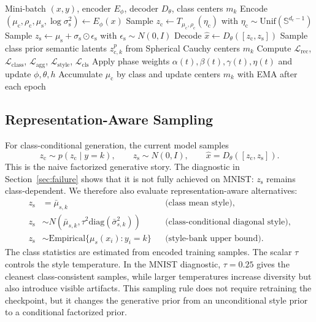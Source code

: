 \documentclass[10pt]{article}
\newcommand{\ours}{F-CS-WAE}
\newcommand{\zc}{z_{\mathrm{c}}}
\newcommand{\zs}{z_{\mathrm{s}}}
\newcommand{\Sph}{\mathbb{S}}
\begin{document}
\begin{algorithm}[t]
\caption{\ours{} training loop}
\label{alg:fcswae}
\begin{algorithmic}[1]
\Require Mini-batch $(x,y)$, encoder $E_\phi$, decoder $D_\theta$, class centers $m_k$
\State Encode $(\mu_{\mathrm{c}},\rho_{\mathrm{c}},\mu_{\mathrm{s}},\log\sigma_{\mathrm{s}}^2)\leftarrow E_\phi(x)$
\State Sample $\zc\leftarrow T_{\mu_{\mathrm{c}},\rho_{\mathrm{c}}}(\eta_{\mathrm{c}})$ with $\eta_{\mathrm{c}}\sim\mathrm{Unif}(\Sph^{d_{\mathrm{c}}-1})$
\State Sample $\zs\leftarrow \mu_{\mathrm{s}}+\sigma_{\mathrm{s}}\odot \epsilon_{\mathrm{s}}$ with $\epsilon_{\mathrm{s}}\sim N(0,I)$
\State Decode $\hat{x}\leftarrow D_\theta([\zc,\zs])$
\State Sample class prior semantic latents $z_{\mathrm{c},k}^p$ from Spherical Cauchy centers $m_k$
\State Compute $\mathcal{L}_{\mathrm{rec}}$, $\mathcal{L}_{\mathrm{class}}$, $\mathcal{L}_{\mathrm{agg}}$, $\mathcal{L}_{\mathrm{style}}$, $\mathcal{L}_{\mathrm{cls}}$
\State Apply phase weights $\alpha(t),\beta(t),\gamma(t),\eta(t)$ and update $\phi,\theta,h$
\State Accumulate $\mu_{\mathrm{c}}$ by class and update centers $m_k$ with EMA after each epoch
\end{algorithmic}
\end{algorithm}

\subsection{Representation-Aware Sampling}

For class-conditional generation, the current model samples
\begin{equation}
    \zc\sim p(\zc\mid y=k),
    \qquad
    \zs\sim N(0,I),
    \qquad
    \hat{x}=D_\theta([\zc,\zs]).
\end{equation}
This is the naive factorized generative story. The diagnostic in Section~\ref{sec:failure} shows that it is not fully achieved on MNIST: $\zs$ remains class-dependent. We therefore also evaluate representation-aware alternatives:
\begin{align}
    \zs &= \bar{\mu}_{s,k}
    &&\text{(class mean style)},\\
    \zs &\sim N(\bar{\mu}_{s,k}, \tau^2\mathrm{diag}(\bar{\sigma}_{s,k}^2))
    &&\text{(class-conditional diagonal style)},\\
    \zs &\sim \mathrm{Empirical}\{ \mu_s(x_i): y_i=k\}
    &&\text{(style-bank upper bound)}.
\end{align}
The class statistics are estimated from encoded training samples. The scalar $\tau$ controls the style temperature. In the MNIST diagnostic, $\tau=0.25$ gives the cleanest class-consistent samples, while larger temperatures increase diversity but also introduce visible artifacts. This sampling rule does not require retraining the checkpoint, but it changes the generative prior from an unconditional style prior to a conditional factorized prior.
\end{document}

